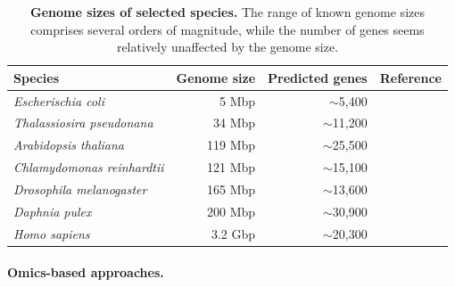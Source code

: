 \begin{table}
\begin{tabular}{|l|r|r|l|}
\hline
Species & Genome size & Predicted genes & Reference \\
\hline
{\em Escherischia coli} & 5 Mbp & $\sim$5,400 & \cite{Welch2002} \\
{\em Thalassiosira pseudonana} & 34 Mbp & $\sim$11,200 & \cite{Armbrust2004} \\
{\em Arabidopsis thaliana} & 119 Mbp & $\sim$25,500 & \cite{Arabidopsis2000} \\
{\em Chlamydomonas reinhardtii} & 121 Mbp & $\sim$15,100 & \cite{Merchant2007} \\
{\em Drosophila melanogaster} & 165 Mbp & $\sim$13,600 & \cite{Adams2000} \\
{\em Daphnia pulex} & 200 Mbp & $\sim$30,900 & \cite{Colbourne2011} \\
{\em Homo sapiens} & 3.2 Gbp & $\sim$20,300 & \cite{Venter2001} \\
\hline
\end{tabular}
\caption{{\bf Genome sizes of selected species.} The range of known genome sizes 
    comprises several orders of magnitude, while the number of genes seems
    relatively unaffected by the genome size.
}
\label{tab:genome-sizes}
\end{table}

\paragraph{Omics-based approaches.}

